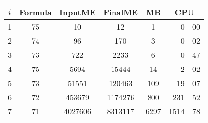 \begin{tabular}{|c|c|c|c|c|r@{.}l|} \hline
$i$ & Formula & InputME & FinalME & MB & \multicolumn{2}{c|}{CPU}\\
\hline 
1 & 75 & 10 & 12 & 1 & 0&00\\
2 & 74 & 96 & 170 & 3 & 0&02\\
3 & 73 & 722 & 2233 & 6 & 0&47\\
4 & 75 & 5694 & 15444 & 14 & 2&02\\
5 & 73 & 51551 & 120463 & 109 & 19&07\\
6 & 72 & 453679 & 1174276 & 800 & 231&52\\
7 & 71 & 4027606 & 8313117 & 6297 & 1514&78\\
\hline
\end{tabular}
